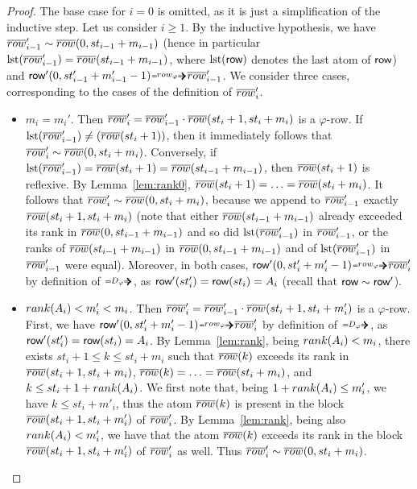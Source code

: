 \begin{proof}
The base case for $i=0$ is omitted, as it is just a simplification of the inductive step.
Let us consider $i\geq 1$. By the inductive hypothesis, we have $\overline{row}'_{i-1}\sim \overline{row}(0, st_{i-1}+m_{i-1})$ (hence in particular $\operatorname{lst}(\overline{row}'_{i-1})=\overline{row}(st_{i-1}+m_{i-1})$, where $\operatorname{lst}(\text{{\sffamily row}})$ denotes the last atom of $\text{{\sffamily row}}$) and $\row'(0, st_{i-1}'+m_{i-1}'-1)\rownext \orow_{i-1}'$.
We consider three cases, corresponding to the cases of the definition of $\overline{row}_i'$.
\begin{itemize}
	\item $m_i=m_i'$. Then $\overline{row}'_i = \overline{row}'_{i-1} \cdot \overline{row}(st_i+1, st_i+m_i)$ is a $\varphi$-row. If $\operatorname{lst}(\overline{row}'_{i-1})\neq (\overline{row}(st_i+1))$, then it immediately follows that $\overline{row}'_i\sim \overline{row}(0, st_{i}+m_{i})$. 
	Conversely, if $\operatorname{lst}(\overline{row}'_{i-1})=\overline{row}(st_i+1)=\overline{row}(st_{i-1}+m_{i-1})$, then $\overline{row}(st_i+1)$ is reflexive. By Lemma~\ref{lem:rank0}, $\overline{row}(st_i+1)=\ldots = \overline{row}(st_i+m_i)$. It follows that $\overline{row}'_i\sim \overline{row}(0, st_{i}+m_{i})$, because we append to $\overline{row}'_{i-1}$ exactly $\overline{row}(st_i+1, st_i+m_i)$ (note that either $\overline{row}(st_{i-1}+m_{i-1})$ already exceeded its rank in $\overline{row}(0, st_{i-1}+m_{i-1})$ and so did $\operatorname{lst}(\overline{row}_{i-1}')$ in $\overline{row}_{i-1}'$, or the ranks of $\overline{row}(st_{i-1}+m_{i-1})$ in $\overline{row}(0, st_{i-1}+m_{i-1})$ and of $\operatorname{lst}(\overline{row}_{i-1}')$ in $\overline{row}_{i-1}'$ were equal).
	Moreover, in both cases, $\row'(0, st_i'+m_i'-1)\rownext \orow_i'$ by definition of $\genDphi$, as $\text{{\sffamily row}}'(st'_i)=\text{{\sffamily row}}(st_i)=A_i$ (recall that $\text{{\sffamily row}}\sim\text{{\sffamily row}}'$). 
	
	\item $rank(A_i)<m'_i<m_i$. Then $\overline{row}'_i = \overline{row}'_{i-1} \cdot \overline{row}(st_i+1, st_i+m'_i)$ is a $\varphi$-row. 
	First, we have $\row'(0, st_i'+m_i'-1)\rownext \orow_i'$ by definition of $\genDphi$, as $\text{{\sffamily row}}'(st'_i)=\text{{\sffamily row}}(st_i)=A_i$. 
	By Lemma~\ref{lem:rank}, being $rank(A_i)<m_i$, there exists $st_i+1\leq k\leq st_i+m_i$ such that $\overline{row}(k)$ exceeds its rank in $\overline{row}(st_i+1, st_i+m_i)$, $\overline{row}(k)=\ldots =\overline{row}(st_i+m_i)$, and $k\leq st_i+1+rank(A_i)$. We first note that, being $1+rank(A_i)\leq m'_i$, we have $k\leq st_i+m'_i$, thus the atom $\overline{row}(k)$ is present in the block $\overline{row}(st_i+1, st_i+m'_i)$ of $\overline{row}'_i$. 
	By Lemma~\ref{lem:rank}, being also $rank(A_i)<m'_i$, we have that the atom $\overline{row}(k)$ exceeds its rank in the block  $\overline{row}(st_i+1, st_i+m'_i)$ of $\overline{row}'_i$ as well. Thus $\overline{row}'_i\sim \overline{row}(0, st_i+m_i)$.
	

\end{itemize}
\end{proof}
